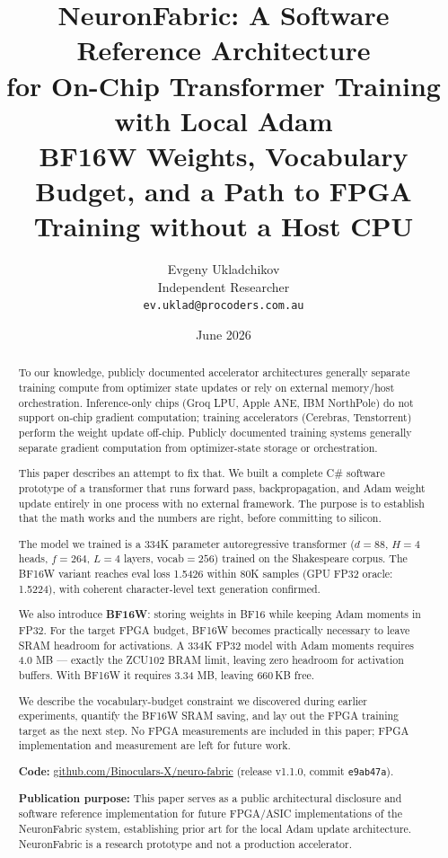 \documentclass[11pt]{article}
\title{\textbf{NeuronFabric: A Software Reference Architecture\\
for On-Chip Transformer Training with Local Adam}\\[0.5em]
\large BF16W Weights, Vocabulary Budget, and a Path to FPGA Training without a Host CPU}
\author{
  Evgeny Ukladchikov \\
  Independent Researcher \\
  \texttt{ev.uklad@procoders.com.au} \\[0.3em]
  \small \href{\repourl}{\repourltext}
}
\date{June 2026}
\newcommand{\repourl}{https://github.com/Binoculars-X/neuro-fabric}
\newcommand{\gpuvaloss}{1.5224}
\newcommand{\cpubfvaloss}{1.5426}
\newcommand{\repourltext}{github.com/Binoculars-X/neuro-fabric}
\newcommand{\repoversion}{v1.1.0}
\newcommand{\repocommit}{e9ab47a}
\begin{document}
\maketitle

\begin{abstract}

To our knowledge, publicly documented accelerator architectures generally separate
training compute from optimizer state updates or rely on external memory/host
orchestration. Inference-only chips (Groq LPU, Apple ANE, IBM NorthPole) do not
support on-chip gradient computation; training accelerators (Cerebras, Tenstorrent)
perform the weight update off-chip.
Publicly documented training systems generally separate gradient computation from optimizer-state storage or orchestration.

This paper describes an attempt to fix that. We built a complete C\# software prototype
of a transformer that runs forward pass, backpropagation, and Adam weight update
entirely in one process with no external framework. The purpose is to establish that
the math works and the numbers are right, before committing to silicon.

The model we trained is a 334K parameter autoregressive transformer
($d{=}88$, $H{=}4$ heads, $f{=}264$, $L{=}4$ layers, vocab$=256$) trained on the
Shakespeare corpus. The BF16W variant reaches eval loss \cpubfvaloss{} within 80K samples
(GPU FP32 oracle: \gpuvaloss{}), with coherent character-level text generation confirmed.

We also introduce \textbf{BF16W}: storing weights in BF16 while keeping Adam moments
in FP32. For the target FPGA budget, BF16W becomes practically necessary to leave SRAM headroom for activations.
A 334K FP32 model with Adam moments requires 4.0 MB --- exactly the ZCU102 BRAM limit,
leaving zero headroom for activation buffers. With BF16W it requires 3.34 MB,
leaving 660\,KB free.

We describe the vocabulary-budget constraint we discovered during earlier experiments,
quantify the BF16W SRAM saving, and lay out the FPGA training target as the next step.
No FPGA measurements are included in this paper; FPGA implementation and measurement are left for future work.

\textbf{Code:} \href{\repourl}{\repourltext} (release \repoversion, commit \texttt{\repocommit}).

\textbf{Publication purpose:} This paper serves as a public architectural disclosure
and software reference implementation for future FPGA/ASIC implementations of the
NeuronFabric system, establishing prior art for the local Adam update architecture.
NeuronFabric is a research prototype and not a production accelerator.

\end{abstract}
\end{document}
